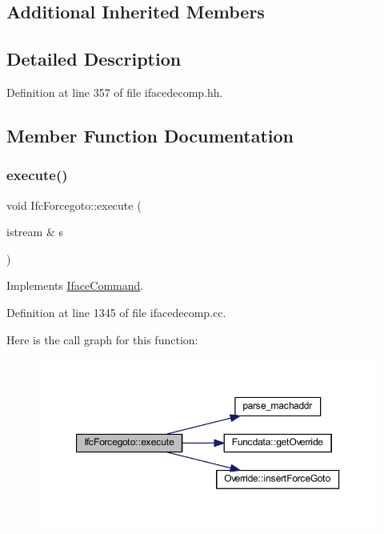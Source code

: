 \subsection*{Additional Inherited Members}


\subsection{Detailed Description}


Definition at line 357 of file ifacedecomp.\+hh.



\subsection{Member Function Documentation}
\mbox{\label{class_ifc_forcegoto_a5241453f234330ace35c00d319acd944}} 
\subsubsection{\texorpdfstring{execute()}{execute()}}
{\footnotesize\ttfamily void Ifc\+Forcegoto\+::execute (\begin{DoxyParamCaption}\item[{istream \&}]{s }\end{DoxyParamCaption})\hspace{0.3cm}{\ttfamily [virtual]}}



Implements \mbox{\hyperlink{class_iface_command_af10e29cee2c8e419de6efe9e680ad201}{Iface\+Command}}.



Definition at line 1345 of file ifacedecomp.\+cc.

Here is the call graph for this function\+:
\nopagebreak
\begin{figure}[H]
\begin{center}
\leavevmode
\includegraphics[width=350pt]{class_ifc_forcegoto_a5241453f234330ace35c00d319acd944_cgraph}
\end{center}
\end{figure}


